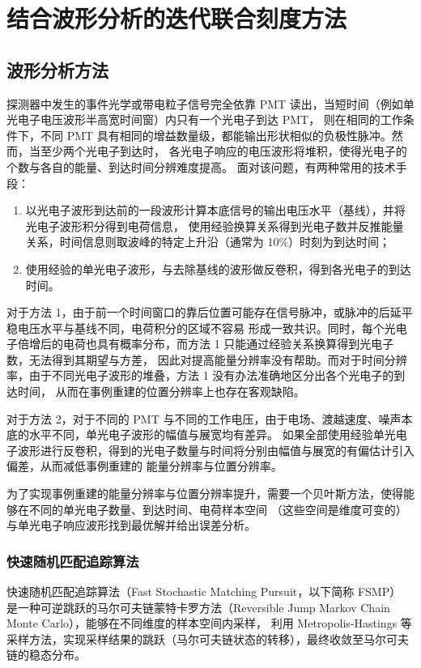 
\chapter{结合波形分析的迭代联合刻度方法}

\section{波形分析方法}
探测器中发生的事件光学或带电粒子信号完全依靠 PMT 读出，当短时间（例如单光电子电压波形半高宽时间窗）内只有一个光电子到达 PMT，
则在相同的工作条件下，不同 PMT 具有相同的增益数量级，都能输出形状相似的负极性脉冲。然而，当至少两个光电子到达时，
各光电子响应的电压波形将堆积，使得光电子的个数与各自的能量、到达时间分辨难度提高。
面对该问题，有两种常用的技术手段：
\begin{enumerate}
    \item 以光电子波形到达前的一段波形计算本底信号的输出电压水平（基线），并将光电子波形积分得到电荷信息，
    使用经验换算关系得到光电子数并反推能量关系，时间信息则取波峰的特定上升沿（通常为 10\%）时刻为到达时间；
    \item 使用经验的单光电子波形，与去除基线的波形做反卷积，得到各光电子的到达时间。
\end{enumerate}

对于方法 1，由于前一个时间窗口的靠后位置可能存在信号脉冲，或脉冲的后延平稳电压水平与基线不同，电荷积分的区域不容易
形成一致共识。同时，每个光电子倍增后的电荷也具有概率分布，而方法 1 只能通过经验关系换算得到光电子数，无法得到其期望与方差，
因此对提高能量分辨率没有帮助。而对于时间分辨率，由于不同光电子波形的堆叠，方法 1 没有办法准确地区分出各个光电子的到达时间，
从而在事例重建的位置分辨率上也存在客观缺陷。

对于方法 2，对于不同的 PMT 与不同的工作电压，由于电场、渡越速度、噪声本底的水平不同，单光电子波形的幅值与展宽均有差异。
如果全部使用经验单光电子波形进行反卷积，得到的光电子数量与时间将分别由幅值与展宽的有偏估计引入偏差，从而减低事例重建的
能量分辨率与位置分辨率。

为了实现事例重建的能量分辨率与位置分辨率提升，需要一个贝叶斯方法，使得能够在不同的单光电子数量、到达时间、电荷样本空间
（这些空间是维度可变的）与单光电子响应波形找到最优解并给出误差分析。
\subsection{快速随机匹配追踪算法}\label{sec:fsmp}
快速随机匹配追踪算法（Fast Stochastic Matching Pursuit，以下简称 FSMP）\cite{wangFastStochasticMatching2024a}
是一种可逆跳跃的马尔可夫链蒙特卡罗方法（Reversible Jump Markov Chain Monte Carlo），能够在不同维度的样本空间内采样，
利用 Metropolis-Hastings 等采样方法，实现采样结果的跳跃（马尔可夫链状态的转移），最终收敛至马尔可夫链的稳态分布。

